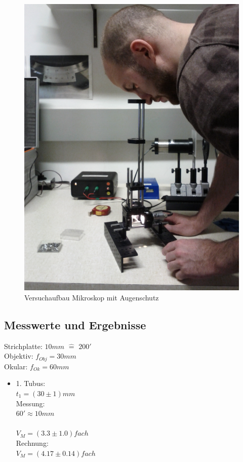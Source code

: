 \documentclass[12pt,a4paper]{article}
\begin{document}
\begin{multicols}{2}
\begin{figure}[H]
	\centering
	\includegraphics[angle=-90,scale=0.1]{./figure/mikroskop.jpg}
	\caption{Versuchaufbau Mikroskop mit Augenschutz}
	\label{fig:mikroskop_aufbau}
\end{figure}

\subsection{Messwerte und Ergebnisse}

Strichplatte: $10mm$ $\widehat{=}$ $200'$\\
Objektiv: $f_{Obj}=30mm$\\
Okular: $f_{Ok}=60mm$\\

\begin{itemize}

	\item 1. Tubus:\\
	$t_1=(30 \pm 1) mm$\\
	Messung:\\
	$60' \approx 10mm$\\
	\\
	$V_M= (3.3 \pm 1.0)fach$\\
	Rechnung: \\
	$V_M=(4.17\pm 0.14)fach$
	

\end{itemize}
\end{multicols}
\end{document}
